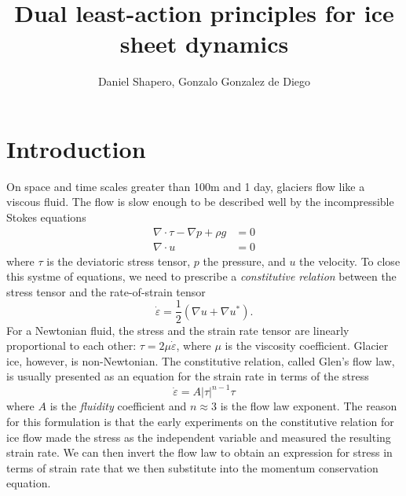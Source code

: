 \documentclass{article}
\title{Dual least-action principles for ice sheet dynamics}
\author{Daniel Shapero, Gonzalo Gonzalez de Diego}
\date{}
\theoremstyle{definition}
\theoremstyle{plain}
\begin{document}
\maketitle

\section{Introduction}

On space and time scales greater than 100m and 1 day, glaciers flow like a viscous fluid.
The flow is slow enough to be described well by the incompressible Stokes equations
\begin{align}
    \nabla\cdot\tau - \nabla p + \rho g & = 0 \\
    \nabla\cdot u & = 0
\end{align}
where $\tau$ is the deviatoric stress tensor, $p$ the pressure, and $u$ the velocity.
To close this systme of equations, we need to prescribe a \emph{constitutive relation} between the stress tensor and the rate-of-strain tensor
\begin{equation}
    \dot\varepsilon = \frac{1}{2}(\nabla u + \nabla u^*).
\end{equation}
For a Newtonian fluid, the stress and the strain rate tensor are linearly proportional to each other: $\tau = 2\mu\dot\varepsilon$, where $\mu$ is the viscosity coefficient.
Glacier ice, however, is non-Newtonian.
The constitutive relation, called Glen's flow law, is usually presented as an equation for the strain rate in terms of the stress
\begin{equation}
    \dot\varepsilon = A|\tau|^{n - 1}\tau
    \label{eq:glen-flow-law}
\end{equation}
where $A$ is the \emph{fluidity} coefficient and $n \approx 3$ is the flow law exponent.
The reason for this formulation is that the early experiments on the constitutive relation for ice flow made the stress as the independent variable and measured the resulting strain rate.
We can then invert the flow law to obtain an expression for stress in terms of strain rate that we then substitute into the momentum conservation equation.
\end{document}
